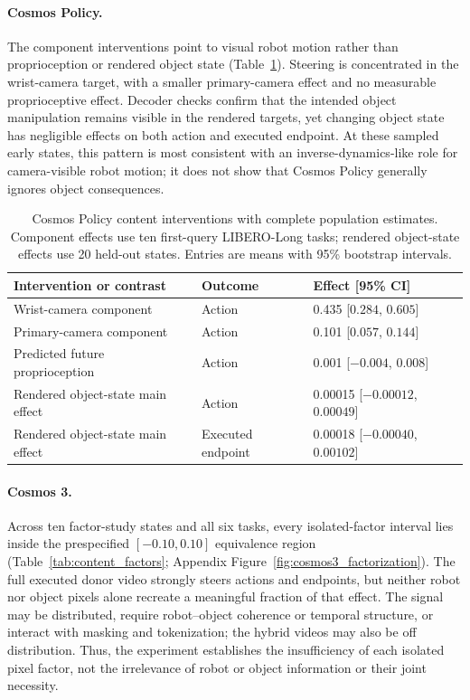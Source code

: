 \documentclass{article}
\begin{document}
\paragraph{Cosmos Policy.}
The component interventions point to visual robot motion rather than proprioception or rendered object state (Table~\ref{tab:policy_content}). Steering is concentrated in the wrist-camera target, with a smaller primary-camera effect and no measurable proprioceptive effect. Decoder checks confirm that the intended object manipulation remains visible in the rendered targets, yet changing object state has negligible effects on both action and executed endpoint. At these sampled early states, this pattern is most consistent with an inverse-dynamics-like role for camera-visible robot motion; it does not show that Cosmos Policy generally ignores object consequences.

\begin{table}[H]
  \caption{Cosmos Policy content interventions with complete population estimates. Component effects use ten first-query LIBERO-Long tasks; rendered object-state effects use 20 held-out states. Entries are means with 95\% bootstrap intervals.}
  \label{tab:policy_content}
  \centering
  \scriptsize
  \setlength{\tabcolsep}{8pt}
  \begin{tabular}{@{}lll@{}}
    \toprule
    Intervention or contrast & Outcome & Effect [95\% CI] \\
    \midrule
    Wrist-camera component & Action & 0.435 [$0.284$, $0.605$] \\
    Primary-camera component & Action & 0.101 [$0.057$, $0.144$] \\
    Predicted future proprioception & Action & 0.001 [$-0.004$, $0.008$] \\
    Rendered object-state main effect & Action & 0.00015 [$-0.00012$, $0.00049$] \\
    Rendered object-state main effect & Executed endpoint & 0.00018 [$-0.00040$, $0.00102$] \\
    \bottomrule
  \end{tabular}
\end{table}

\paragraph{Cosmos 3.}
Across ten factor-study states and all six tasks, every isolated-factor interval lies inside the prespecified $[-0.10,0.10]$ equivalence region (Table~\ref{tab:content_factors}; Appendix Figure~\ref{fig:cosmos3_factorization}). The full executed donor video strongly steers actions and endpoints, but neither robot nor object pixels alone recreate a meaningful fraction of that effect. The signal may be distributed, require robot--object coherence or temporal structure, or interact with masking and tokenization; the hybrid videos may also be off distribution. Thus, the experiment establishes the insufficiency of each isolated pixel factor, not the irrelevance of robot or object information or their joint necessity.
\end{document}
